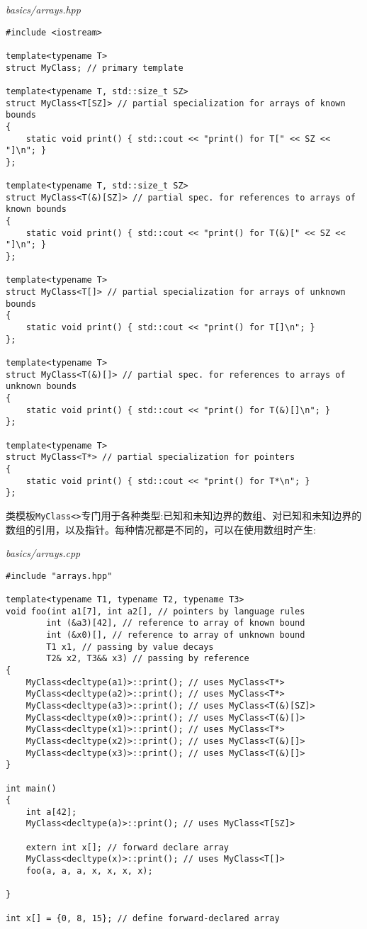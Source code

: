 \noindent
\textit{basics/arrays.hpp}
\begin{lstlisting}[style=styleCXX]
#include <iostream>

template<typename T>
struct MyClass; // primary template

template<typename T, std::size_t SZ>
struct MyClass<T[SZ]> // partial specialization for arrays of known bounds
{
	static void print() { std::cout << "print() for T[" << SZ << "]\n"; }
};

template<typename T, std::size_t SZ>
struct MyClass<T(&)[SZ]> // partial spec. for references to arrays of known bounds
{
	static void print() { std::cout << "print() for T(&)[" << SZ << "]\n"; }
};

template<typename T>
struct MyClass<T[]> // partial specialization for arrays of unknown bounds
{
	static void print() { std::cout << "print() for T[]\n"; }
};

template<typename T>
struct MyClass<T(&)[]> // partial spec. for references to arrays of unknown bounds
{
	static void print() { std::cout << "print() for T(&)[]\n"; }
};

template<typename T>
struct MyClass<T*> // partial specialization for pointers
{
	static void print() { std::cout << "print() for T*\n"; }
};
\end{lstlisting}

类模板\texttt{MyClass<>}专门用于各种类型:已知和未知边界的数组、对已知和未知边界的数组的引用，以及指针。每种情况都是不同的，可以在使用数组时产生:

\noindent
\textit{basics/arrays.cpp}
\begin{lstlisting}[style=styleCXX]
#include "arrays.hpp"

template<typename T1, typename T2, typename T3>
void foo(int a1[7], int a2[], // pointers by language rules
		int (&a3)[42], // reference to array of known bound
		int (&x0)[], // reference to array of unknown bound
		T1 x1, // passing by value decays
		T2& x2, T3&& x3) // passing by reference
{
	MyClass<decltype(a1)>::print(); // uses MyClass<T*>
	MyClass<decltype(a2)>::print(); // uses MyClass<T*>
	MyClass<decltype(a3)>::print(); // uses MyClass<T(&)[SZ]>
	MyClass<decltype(x0)>::print(); // uses MyClass<T(&)[]>
	MyClass<decltype(x1)>::print(); // uses MyClass<T*>
	MyClass<decltype(x2)>::print(); // uses MyClass<T(&)[]>
	MyClass<decltype(x3)>::print(); // uses MyClass<T(&)[]>
}

int main()
{
	int a[42];
	MyClass<decltype(a)>::print(); // uses MyClass<T[SZ]>
	
	extern int x[]; // forward declare array
	MyClass<decltype(x)>::print(); // uses MyClass<T[]>
	foo(a, a, a, x, x, x, x);
	
}

int x[] = {0, 8, 15}; // define forward-declared array
\end{lstlisting}

